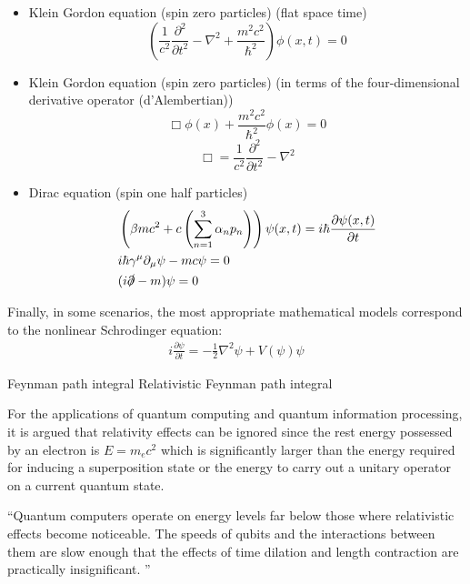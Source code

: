 \documentclass[]{article}
\begin{document}
\begin{itemize}
\item Klein Gordon equation (spin zero particles) (flat space time)
\begin{equation}
\left(\frac{1}{c^2}\frac{\partial^2}{\partial t^2} - \nabla^2 + \frac{m^2 c^2}{\hbar^2}\right) \phi(x,t) = 0
\end{equation}
\item Klein Gordon equation (spin zero particles) (in terms of the four-dimensional derivative operator (d'Alembertian))
\begin{equation}
\Box \phi(x) + \frac{m^2 c^2}{\hbar^2} \phi(x) = 0
\end{equation}
\begin{equation}
\Box=\frac{1}{c^{2}}\frac{\partial^{2}}{\partial t^{2}}-\nabla^{2}
\end{equation}
\item Dirac equation (spin one half particles)
\begin{align}
& \left(\beta m c^2 + c \left(\sum_{n=1}^3\alpha_n p_n\right)\right) \psi(x,t) = i\hbar \frac{\partial \psi(x,t)}{\partial t}\\
& i\hbar\gamma^\mu \partial_\mu \psi - mc\psi = 0 \\
& (i\slashed{\partial} - m)\psi = 0
\end{align}
\end{itemize}

Finally, in some scenarios, the most appropriate mathematical models 
correspond to the nonlinear Schrodinger equation:
\begin{eqnarray*}
i\frac{\partial \psi}{\partial t} = -\frac{1}{2} \nabla^2 \psi + V(\psi) \psi
\end{eqnarray*}

Feynman path integral\cite{beau2012feynman}
Relativistic Feynman path integral\cite{struckmeier2024relativistic}

For the applications of quantum computing and quantum information 
processing, it is argued that relativity effects can be ignored since
the rest energy possessed by an electron is $E=m_{e}c^{2}$ which is 
significantly larger than the energy required for inducing a 
superposition state or the energy to carry out a unitary operator on a
current quantum state.

``Quantum computers operate on energy levels far below those where relativistic effects become noticeable. The speeds of qubits and the interactions between them are slow enough that the effects of time dilation and length contraction are practically insignificant. ''
\end{document}
